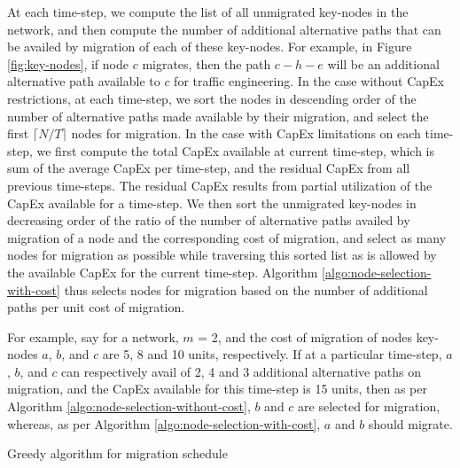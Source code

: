 \documentclass[conference]{IEEEtran}
\begin{document}
\par At each time-step, we compute the list of all unmigrated key-nodes in the
network, and then compute the number of additional alternative paths that can be
availed by migration of each of these key-nodes. For example, in Figure
\ref{fig:key-nodes}, if node $c$ migrates, then the path $c-h-e$ will be an
additional alternative path available to $c$ for traffic engineering. In the
case without CapEx restrictions, at each time-step, we sort the nodes in
descending order of the number of alternative paths made available by their
migration, and select the first $\lceil N/T \rceil$ nodes for migration.
In the case with CapEx limitations on each time-step, we first compute the total
CapEx available at current time-step, which is sum of the average CapEx per
time-step, and the residual CapEx from all previous time-steps. The residual
CapEx results from partial utilization of the CapEx available for a time-step.
We then sort the unmigrated key-nodes in decreasing order of the ratio of the
number of alternative paths availed by migration of a node and the corresponding
cost of migration, and select as many nodes for migration as possible while
traversing this sorted list as is allowed by the available CapEx for the current
time-step.
Algorithm \ref{algo:node-selection-with-cost} thus selects nodes for migration
based on the number of additional paths per unit cost of migration.

\par For example, say for a network, $m$ = 2, and the cost of migration of nodes
key-nodes $a$, $b$, and $c$ are 5, 8 and 10 units, respectively. If
at a particular time-step, $a$, $b$, and $c$ can respectively avail of 2, 4 and
3 additional alternative paths on migration, and the CapEx available for this
time-step is 15 units, then as per Algorithm
\ref{algo:node-selection-without-cost}, $b$ and $c$ are selected for migration,
whereas, as per Algorithm \ref{algo:node-selection-with-cost}, $a$ and $b$
should migrate.

\begin{algorithm}
\caption{Greedy algorithm for migration schedule} \label{algo:greedy-algo}
\begin{algorithmic}
	\ENDFOR
\ENDFOR
\end{algorithmic}
\end{algorithm}
\end{document}

